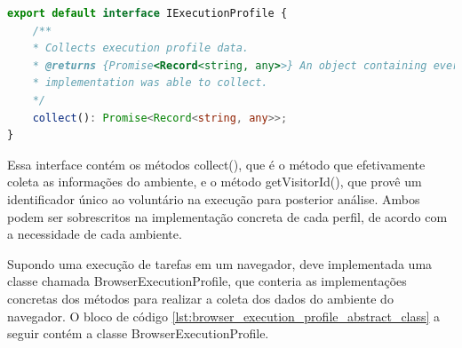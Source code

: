 \documentclass[12pt]{tcc}
\begin{document}
\begin{lstlisting}[label={lst:execution_profile_abstract_class}, caption={Implementação da classe responsável por representar um perfil de execução.}, language=TypeScript, breaklines=true]
export default interface IExecutionProfile {
	/**
	* Collects execution profile data.
	* @returns {Promise<Record<string, any>>} An object containing every execution profile data the
	* implementation was able to collect.
	*/
	collect(): Promise<Record<string, any>>;
}
\end{lstlisting}

Essa interface contém os métodos collect(), que é o método que efetivamente coleta as informações do ambiente, e o método getVisitorId(), que provê um identificador único ao voluntário na execução para posterior análise. Ambos podem ser sobrescritos na implementação concreta de cada perfil, de acordo com a necessidade de cada ambiente.

Supondo uma execução de tarefas em um navegador, deve implementada uma classe chamada BrowserExecutionProfile, que conteria as implementações concretas dos métodos para realizar a coleta dos dados do ambiente do navegador. O bloco de código \ref{lst:browser_execution_profile_abstract_class} a seguir contém a classe BrowserExecutionProfile.
\end{document}
